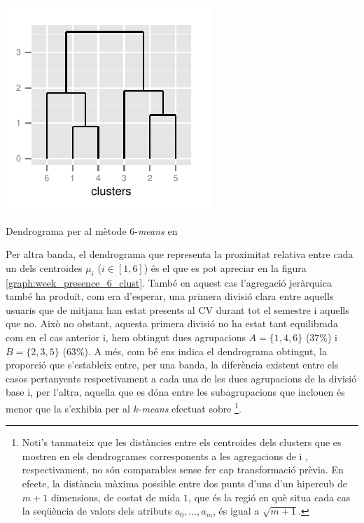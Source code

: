 \documentclass[
	a4paper,
	twoside,
	justified
]{tufte-book}
\begin{document}
\begin{marginfigure}
\begin{center}
\includegraphics{week_presence_complete_dendrogram_6means_clusts}
\caption{
\label{graph:week_presence_complete_dendrogram_6means_clusts}
	Dendrograma per al mètode 6-\emph{means} en  
}
\end{center}
\end{marginfigure}

Per altra banda, el dendrograma que representa la proximitat relativa entre cada un dels centroides $\mu_i$ ($i \in [1,6]$) és el que es pot apreciar en la figura \ref{graph:week_presence_6_clust}. També en aquest cas l'agregació jeràrquica també ha produït, com era d'esperar, una primera divisió clara entre aquells usuaris que de mitjana han estat presents al CV durant tot el semestre i aquells que no. Això no obstant, aquesta primera divisió no ha estat tant equilibrada com en el cas anterior i, hem obtingut dues agrupacions $A = \{1,4,6\}$ ($37\%$) i $B = \{2,3,5\}$ ($63\%$). A més, com bé ens indica el dendrograma obtingut, la proporció que s'estableix entre, per una banda, la diferència existent entre els casos pertanyents respectivament a cada una de les dues agrupacions de la divisió base i, per l'altra, aquella que es dóna entre les subagrupacions que inclouen és menor que la s'exhibia per al $k$-\emph{means} efectuat sobre \footnote[][-3\baselineskip]{Noti's tanmateix que les distàncies entre els centroides dels clusters que es mostren en els dendrogrames corresponents a les agregacions de  i , respectivament, no són comparables sense fer cap transformació prèvia. En efecte, la distància màxima possible entre dos punts d'uns d'un hipercub de $m+1$ dimensions, de costat de mida $1$, que és la regió en què situa cada cas la seqüència de valors dels atributs $a_0,\ldots, a_m$, és igual a $\sqrt{m+1}$.}.
\end{document}
